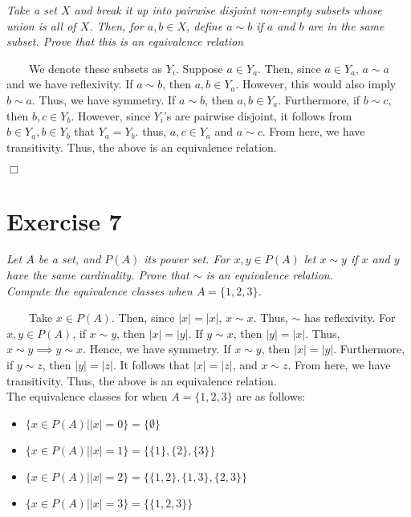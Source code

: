 \documentclass[
]{article}
\begin{document}
\emph{Take a set \(X\) and break it up into pairwise disjoint non-empty
subsets whose union is all of \(X\). Then, for \(a, b \in X\), define
\(a \sim b\) if \(a\) and \(b\) are in the same subset. Prove that this
is an equivalence relation}

~~~~We denote these subsets as \(Y_i\). Suppose \(a \in Y_a\). Then,
since \(a \in Y_a\), \(a \sim a\) and we have reflexivity. If
\(a \sim b\), then \(a, b \in Y_a\). However, this would also imply
\(b \sim a\). Thus, we have symmetry. If \(a \sim b\), then
\(a, b \in Y_a\). Furthermore, if \(b \sim c\), then \(b, c \in Y_b\).
However, since \(Y_i\)'s are pairwise disjoint, it follows from
\(b \in Y_a, b \in Y_b\) that \(Y_a = Y_b\). thus, \(a, c \in Y_a\) and
\(a \sim c\). From here, we have transitivity. Thus, the above is an
equivalence relation.

\hfill \(\Box\)

\hypertarget{exercise-7}{%
\section{Exercise 7}\label{exercise-7}}

\emph{Let \(A\) be a set, and \(P(A)\) its power set. For
\(x,y\in P(A)\) let \(x \sim y\) if \(x\) and \(y\) have the same
cardinality. Prove that \(\sim\) is an equivalence relation.}\\
\emph{Compute the equivalence classes when \(A = \{1, 2, 3\}\).}

~~~~Take \(x \in P(A)\). Then, since \(|x| = |x|\), \(x \sim x\). Thus,
\(\sim\) has reflexivity. For \(x, y \in P(A)\), if \(x \sim y\), then
\(|x| = |y|.\) If \(y \sim x\), then \(|y| = |x|\). Thus,
\(x \sim y \implies y \sim x\). Hence, we have symmetry. If
\(x \sim y\), then \(|x| = |y|\). Furthermore, if \(y \sim z\), then
\(|y| = |z|\). It follows that \(|x| = |z|\), and \(x \sim z\). From
here, we have transitivity. Thus, the above is an equivalence
relation.\\
\hspace*{0.333em}\hspace*{0.333em}\hspace*{0.333em}\hspace*{0.333em}The
equivalence classes for when \(A = \{1, 2, 3\}\) are as follows:\\

\begin{itemize}
\item $\{x \in P(A)| |x| = 0\} = \{\emptyset\}$  
\item $\{x \in P(A)| |x| = 1\} = \{\{1\}, \{2\}, \{3\}\}$  
\item $\{x \in P(A)| |x| = 2\} = \{\{1, 2\}, \{1, 3\}, \{2, 3\}\}$  
\item $\{x \in P(A)| |x| = 3\} = \{\{1, 2, 3\}\}$  
\end{itemize}
\end{document}
